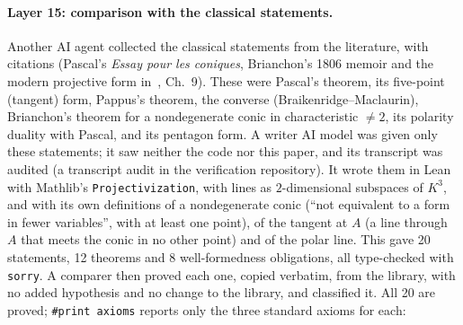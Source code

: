 \documentclass[11pt]{article}
\theoremstyle{remark}
\newcommand{\lean}[1]{\texttt{#1}}
\begin{document}
\paragraph{Layer 15: comparison with the classical statements.} Another AI agent collected the
classical statements from the literature, with citations (Pascal's \emph{Essay pour les coniques},
Brianchon's 1806 memoir and the modern projective form in~\cite{Coxeter}, Ch.~9). These were Pascal's theorem, its
five-point (tangent) form, Pappus's theorem, the converse (Braikenridge--Maclaurin), Brianchon's
theorem for a nondegenerate conic in characteristic $\ne2$, its polarity duality with Pascal, and its
pentagon form. A writer AI model was given only these statements; it saw neither the code nor this
paper, and its transcript was audited (a transcript audit in the verification repository). It wrote them in Lean with Mathlib's \lean{Projectivization},
with lines as $2$-dimensional subspaces of $K^3$, and with its own definitions of a nondegenerate
conic (``not equivalent to a form in fewer variables'', with at least one point), of the tangent at
$A$ (a line through $A$ that meets the conic in no other point) and of the polar line. This gave 20
statements, 12 theorems and 8 well-formedness obligations, all type-checked with \lean{sorry}. A
comparer then proved each one, copied verbatim, from the library, with no added hypothesis and no
change to the library, and classified it. All 20 are proved;
\lean{\#print axioms} reports only the three standard axioms for each:
\end{document}

